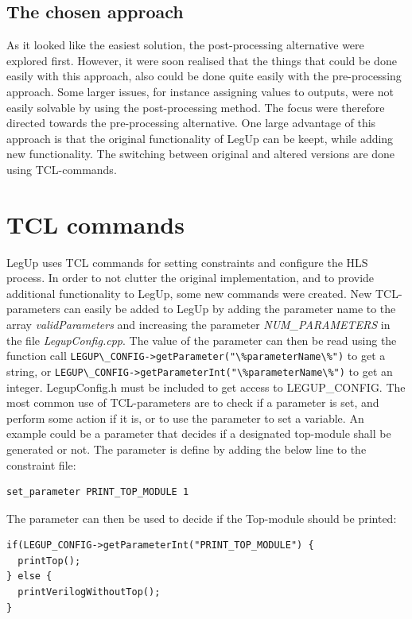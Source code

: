 \subsection{The chosen approach}
As it looked like the easiest solution, the post-processing alternative were explored first. However, it were soon realised that the things that could be done easily with this approach, also could be done quite easily with the pre-processing approach. Some larger issues, for instance assigning values to outputs, were not easily solvable by using the post-processing method. The focus were therefore directed towards the pre-processing alternative. One large advantage of this approach is that the original functionality of LegUp can be keept, while adding new functionality. The switching between original and altered versions are done using TCL-commands.

\section{TCL commands}
LegUp uses TCL commands for setting constraints and configure the HLS process. In order to not clutter the original implementation, and to provide additional functionality to LegUp, some new commands were created. New TCL-parameters can easily be added to LegUp by adding the parameter name to the array \textit{validParameters} and increasing the parameter \textit{NUM\_PARAMETERS} in the file \textit{LegupConfig.cpp}. The value of the parameter can then be read using the function call \verb!LEGUP\_CONFIG->getParameter("\%parameterName\%")! to get a string, or \verb!LEGUP\_CONFIG->getParameterInt("\%parameterName\%")! to get an integer. LegupConfig.h must be included to get access to LEGUP\_CONFIG. The most common use of TCL-parameters are to check if a parameter is set, and perform some action if it is, or to use the parameter to set a variable. An example could be a parameter that decides if a designated top-module shall be generated or not. The parameter is define by adding the below line to the constraint file:

\begin{verbatim}
set_parameter PRINT_TOP_MODULE 1
\end{verbatim}
The parameter can then be used to decide if the Top-module should be printed:
\lstset{language=C++,style=Cstyle}
\begin{lstlisting}
if(LEGUP_CONFIG->getParameterInt("PRINT_TOP_MODULE") {
  printTop();
} else {
  printVerilogWithoutTop();
}
\end{lstlisting}

